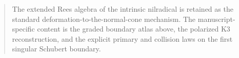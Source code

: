 \begin{abstract}
The extended Rees algebra of the intrinsic nilradical is retained as
the standard deformation-to-the-normal-cone mechanism.  The
manuscript-specific content is the graded boundary atlas above, the
polarized K3 reconstruction, and the explicit primary and collision
laws on the first singular Schubert boundary.
\end{abstract}
\maketitle
